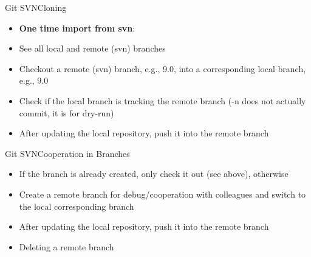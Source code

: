 \begin{frame}{Git SVN}{Cloning}
  \begin{itemize}
    \item \textbf{One time import from svn}:
    \item See all local and remote (svn) branches
    \item  Checkout a remote (svn) branch, e.g., 9.0, into a corresponding local branch, e.g., 9.0
  \item Check if the local branch is tracking the remote branch
   (-n does not actually commit, it is for dry-run)
  \item After updating the local repository, push it into the remote branch
  \end{itemize}
\end{frame}

\begin{frame}{Git SVN}{Cooperation in Branches}
  \begin{itemize}
    \item If the branch is already created, only check it out (see above), otherwise
    \item Create a remote branch for debug/cooperation with colleagues and switch to the local corresponding branch
  \item After updating the local repository, push it into the remote branch
\item Deleting a remote branch 
  \end{itemize}
\end{frame}

